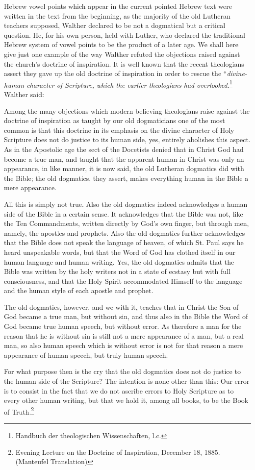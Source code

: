 Hebrew vowel points which appear in the current pointed Hebrew text were written in the text from the beginning, as the majority of the old Lutheran teachers supposed, Walther declared to be not a dogmatical but a critical question.  He, for his own person, held with Luther, who declared the traditional Hebrew system of vowel points to be the product of a later age.
\divider
We shall here give just one example of the way Walther refuted the objections raised against the church’s doctrine of inspiration.  It is well known that the recent theologians assert they gave up the old doctrine of inspiration in order to rescue the “\textit{divine-human character of Scripture, which the earlier theologians had overlooked.}\footnote{Handbuch der theologischen Wissenschaften, l.c.}  Walther said:
\begin{fancyquotes}Among the many objections which modern believing theologians raise against the doctrine of inspiration as taught by our old dogmaticians one of the most common is that this doctrine in its emphasis on the divine character of Holy Scripture does not do justice to its human side, yes, entirely abolishes this aspect.  As in the Apostolic age the sect of the Docetists denied that in Christ God had become a true man, and taught that the apparent human in Christ was only an appearance, in like manner, it is now said, the old Lutheran dogmatics did with the Bible; the old dogmatics, they assert, makes everything human in the Bible a mere appearance. \par  All this is simply not true.  Also the old dogmatics indeed acknowledges a human side of the Bible in a certain sense.  It acknowledges that the Bible was not, like the Ten Commandments, written directly by God’s own finger, but through men, namely, the apostles and prophets.  Also the old dogmatics further acknowledges that the Bible does not speak the language of heaven, of which St. Paul says he heard unspeakable words, but that the Word of God has clothed itself in our human language and human writing.  Yes, the old dogmatics admits that the Bible was written by the holy writers not in a state of ecstasy but with full consciousness, and that the Holy Spirit accommodated Himself to the language and the human style of each apostle and prophet. \par   The old dogmatics, however, and we with it, teaches that in Christ the Son of God became a true man, but without sin, and thus also in the Bible the Word of God became true human speech, but without error.  As therefore a man for the reason that he is without sin is still not a mere appearance of a man, but a real man, so also human speech which is without error is not for that reason a mere appearance of human speech, but truly human speech. \par  For what purpose then is the cry that the old dogmatics does not do justice to the human side of the Scripture?  The intention is none other than this:  Our error is to consist in the fact that we do not ascribe errors to Holy Scripture as to every other human writing, but that we hold it, among all books, to be the Book of Truth.\footnote{Evening Lecture on the Doctrine of Inspiration, December 18, 1885. (Manteufel Translation)}\end{fancyquotes}

